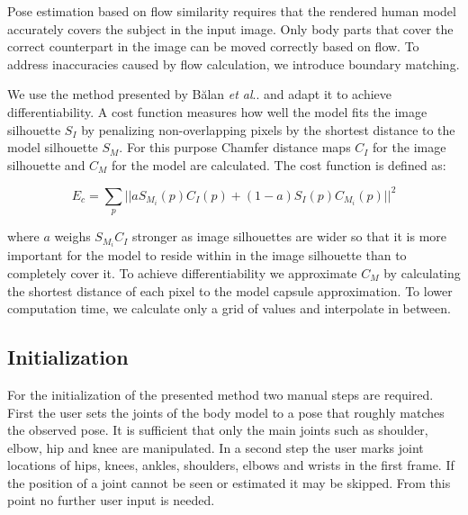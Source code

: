 \documentclass[10pt,twocolumn,letterpaper]{article}
\makeatletter
\DeclareRobustCommand\onedot{\futurelet\@let@token\@onedot}
\def\@onedot{\ifx\@let@token.\else.\null\fi\xspace}
\def\etal{\emph{et al}\onedot}
\makeatother
\begin{document}
Pose estimation based on flow similarity requires that the rendered human model accurately covers the subject in the input image. Only body parts that cover the correct counterpart in the image can be moved correctly based on flow. To address inaccuracies caused by flow calculation, we introduce boundary matching.

We use the method presented by B{\u{a}}lan \etal \cite{bualan2007detailed} and adapt it to achieve differentiability. A cost function measures how well the model fits the image silhouette $S_I$ by penalizing non-overlapping pixels by the shortest distance to the model silhouette $S_M$. For this purpose Chamfer distance maps $C_I$ for the image silhouette  and $C_M$ for the model are calculated. %
The cost function is defined as:

\begin{equation}
E_c = \sum_{p} || a S_{M_i}(p)C_I(p) + (1-a)S_I(p)C_{M_i}(p)||^2
\end{equation}

\noindent where $a$ weighs $S_{M_i}C_I$ stronger as image silhouettes are wider so that it is more important for the model to reside within in the image silhouette than to completely cover it. To achieve differentiability we approximate $C_M$ by calculating the shortest distance of each pixel to the model capsule approximation. To lower computation time, we calculate only a grid of values and interpolate in between.


\subsection{Initialization}

For the initialization of the presented method two manual steps are required. First the user sets the joints of the body model to a pose that roughly matches the observed pose. It is sufficient that only the main joints such as shoulder, elbow, hip and knee are manipulated. In a second step the user marks joint locations of hips, knees, ankles, shoulders, elbows and wrists in the first frame. If the position of a joint cannot be seen or estimated it may be skipped. From this point no further user input is needed.
\end{document}
